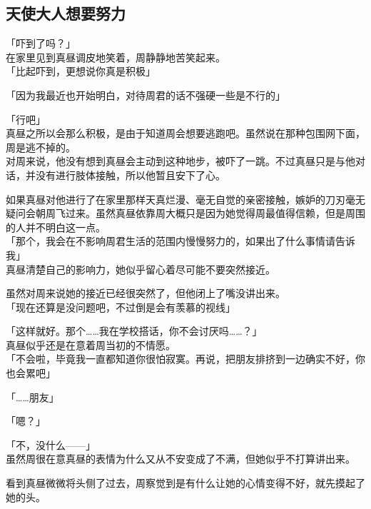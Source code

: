 \subsection{天使大人想要努力}

「吓到了吗？」\\

在家里见到真昼调皮地笑着，周静静地苦笑起来。\\

「比起吓到，更想说你真是积极」

「因为我最近也开始明白，对待周君的话不强硬一些是不行的」

「行吧」\\

真昼之所以会那么积极，是由于知道周会想要逃跑吧。虽然说在那种包围网下面，周是逃不掉的。\\

对周来说，他没有想到真昼会主动到这种地步，被吓了一跳。不过真昼只是与他对话，并没有进行肢体接触，所以他暂且安下了心。

如果真昼对他进行了在家里那样天真烂漫、毫无自觉的亲密接触，嫉妒的刀刃毫无疑问会朝周飞过来。虽然真昼依靠周大概只是因为她觉得周最值得信赖，但是周围的人并不明白这一点。\\

「那个，我会在不影响周君生活的范围内慢慢努力的，如果出了什么事情请告诉我」\\

真昼清楚自己的影响力，她似乎留心着尽可能不要突然接近。

虽然对周来说她的接近已经很突然了，但他闭上了嘴没讲出来。\\

「现在还算是没问题吧，不过倒是会有羡慕的视线」

「这样就好。那个……我在学校搭话，你不会讨厌吗……？」\\

真昼似乎还是在意着周当初的不情愿。\\

「不会啦，毕竟我一直都知道你很怕寂寞。再说，把朋友排挤到一边确实不好，你也会累吧」

「……朋友」

「嗯？」

「不，没什么——」\\

虽然周很在意真昼的表情为什么又从不安变成了不满，但她似乎不打算讲出来。

看到真昼微微将头侧了过去，周察觉到是有什么让她的心情变得不好，就先摸起了她的头。\\

